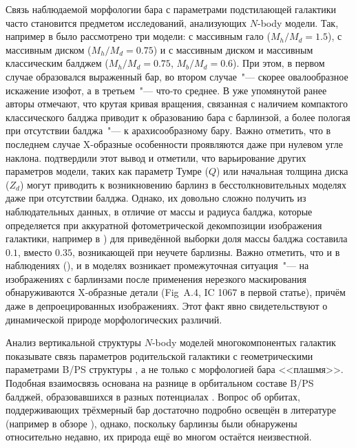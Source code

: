 \documentclass{trlnotes}
\begin{document}
Связь наблюдаемой морфологии бара с параметрами подстилающей галактики часто становится предметом исследований, 
анализующих $N$-body модели. Так, например в \cite{athanassoula2002} было рассмотрено три модели: с массивным гало 
($M_h/M_d = 1.5$), с массивным диском ($M_h/M_d = 0.75$) и с массивным диском и массивным классическим балджем 
($M_h/M_d = 0.75$, $M_b/M_d = 0.6$). При этом, в первом случае образовался выраженный бар, во втором случае~"--- 
скорее овалообразное искажение изофот, а в третьем~"--- что-то среднее. В уже упомянутой ранее 
\cite{salo2017} авторы отмечают, что крутая кривая вращения, связанная с наличием компактого классического 
балджа приводит к образованию бара с барлинзой, а более пологая при отсутствии балджа~"--- к арахисообразному 
бару. Важно отметить, что в последнем случае X-образные особенности проявляются даже при нулевом угле наклона.  
\cite{smirnov2018} подтвердили этот вывод и отметили, что варьирование других параметров модели, таких как 
параметр Тумре ($Q$) или начальная толщина диска ($Z_d$) могут приводить к возникновению барлинз в 
бесстолкновительных моделях даже при отсутствии балджа. Однако, их довольно сложно получить из наблюдательных 
данных, в отличие от массы и радиуса балджа, которые определяется при аккуратной фотометрической декомпозиции 
изображения галактики, например в \cite{laurikainen2014}) для приведённой выборки доля массы балджа составила
$0.1$, вместо $0.35$, возникающей при неучете барлизны. Важно отметить, что и в наблюдениях
(\cite{laurikainen2017}), и в моделях \citep{salo2017} возникает промежуточная ситуация~"--- на изображениях с
барлинзами после применения нерезкого маскирования обнаруживаются X-образные детали (Fig~A.4, IC 1067 в первой
статье), причём даже в депроецированных изображениях. Этот факт явно свидетельствуют о динамической природе
морфологических различий. 

Анализ вертикальной структуры $N$-body моделей многокомпонентых галактик показывате связь параметров родительской
галактики с геометрическими параметрами B/PS структуры \citep{smirnov2018}, а не только с морфологией бара
<<плашмя>>. Подобная взаимосвязь основана на разнице в орбитальном составе B/PS балджей, образовавшихся в разных
потенциалах \citep{parul2020}. Вопрос об орбитах, поддерживающих трёхмерный бар достаточно подробно освещён в
литературе (например в обзоре \cite{athanassoula2016}), однако, поскольку барлинзы были обнаружены относительно
недавно, их природа ещё во многом остаётся неизвестной. 
\end{document}
